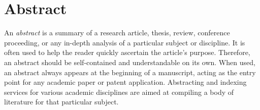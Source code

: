 \chapter*{\Large \center Abstract}

An \emph{abstract} is a summary of a research article, thesis, review, conference proceeding, or any in-depth analysis of a particular subject or discipline. It is often used to help the reader quickly ascertain the article's purpose. Therefore, an abstract should be self-contained and understandable on its own. When used, an abstract always appears at the beginning of a manuscript, acting as the entry point for any academic paper or patent application. Abstracting and indexing services for various academic disciplines are aimed at compiling a body of literature for that particular subject.